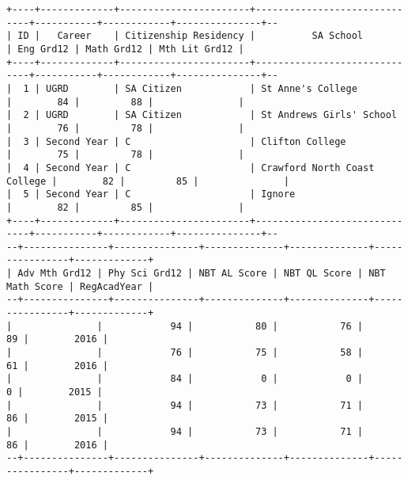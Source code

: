 \begin{sidewaysfigure}
  \centering
  \begin{mdframed}[topline=false,rightline=false,leftline=false]
    \centering
    \begin{BVerbatim}
+----+-------------+-----------------------+------------------------------+-----------+------------+---------------+--
| ID |   Career    | Citizenship Residency |          SA School           | Eng Grd12 | Math Grd12 | Mth Lit Grd12 |
+----+-------------+-----------------------+------------------------------+-----------+------------+---------------+--
|  1 | UGRD        | SA Citizen            | St Anne's College            |        84 |         88 |               |
|  2 | UGRD        | SA Citizen            | St Andrews Girls' School     |        76 |         78 |               |
|  3 | Second Year | C                     | Clifton College              |        75 |         78 |               |
|  4 | Second Year | C                     | Crawford North Coast College |        82 |         85 |               |
|  5 | Second Year | C                     | Ignore                       |        82 |         85 |               |
+----+-------------+-----------------------+------------------------------+-----------+------------+---------------+--
--+---------------+---------------+--------------+--------------+----------------+-------------+
| Adv Mth Grd12 | Phy Sci Grd12 | NBT AL Score | NBT QL Score | NBT Math Score | RegAcadYear |
--+---------------+---------------+--------------+--------------+----------------+-------------+
|               |            94 |           80 |           76 |             89 |        2016 |
|               |            76 |           75 |           58 |             61 |        2016 |
|               |            84 |            0 |            0 |              0 |        2015 |
|               |            94 |           73 |           71 |             86 |        2015 |
|               |            94 |           73 |           71 |             86 |        2016 |
--+---------------+---------------+--------------+--------------+----------------+-------------+
    \end{BVerbatim}
  \end{mdframed}
  \caption[Raw Benchmarks CSV Samples]{\textbf{Figure \ref{fig-benchmarks-csv-sample}: Sample of \texttt{Benchmarks (2014 - 2016).CSV} file used for the ETL process, after processing via Microsoft Excel.} Header names have been shortened in some cases for layout-related reasons.}
  \label{fig-benchmarks-csv-sample}
\end{sidewaysfigure}

